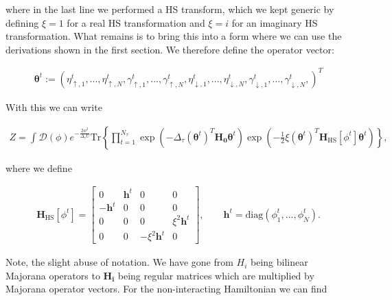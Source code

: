 \documentclass{article}
\begin{document}
where in the last line we performed a HS transform, which we kept generic by defining $\xi = 1$ for a real HS transformation and $\xi = i$ for an imaginary HS transformation. What remains is to bring this into a form where we can use the derivations shown in the first section. We therefore define the operator vector:

\begin{align}
	\boldsymbol{\theta}^{t} := \left(\eta_{\uparrow,1}^{t}, ...,\eta_{\uparrow,N}^{t}, \gamma_{\uparrow,1}^{t} ,...,\gamma_{\uparrow,N}^{t} ,\eta_{\downarrow,1}^{t}, ...,\eta_{\downarrow,N}^{t}, \gamma_{\downarrow,1}^{t} ,...,\gamma_{\downarrow,N}^{t} , \right)^T 
\end{align}

With this we can write

\begin{align}
	Z = \int_{ }^{ } \mathcal{D}\left(\phi\right)e^{-\frac{2\phi^{2} }{\Delta_\tau U}} \mathrm{Tr} \left\{\prod_{t=1}^{N_\tau}\exp \left( -\Delta_\tau \left( \boldsymbol{\theta}^{t} \right)^T \boldsymbol{H_0} \boldsymbol{\theta}^{t}   \right) \exp \left(  -\frac{1}{2}\xi   \left(\boldsymbol{\theta}^{t} \right)^T \boldsymbol{H}_{\mathrm{HS}  }\left[ \phi^{t}  \right]  \boldsymbol{\theta}^{t} \right)  \right\},
\end{align}

where we define

\begin{align}
	\boldsymbol{H}_{\mathrm{HS}  }\left[ \phi^{t}  \right] = \begin{bmatrix}
		0 & \boldsymbol{h}^{t} & 0  & 0 \\
		-\boldsymbol{h}^{t}& 0 & 0  & 0 \\
		0 & 0 & 0 & \xi ^{2}\boldsymbol{h}^{t}\\
		0 & 0 & -\xi^2 \boldsymbol{h}^{t} & 0
	\end{bmatrix}, \quad\quad \boldsymbol{h}^{t} = \mathrm{diag} \left(\phi^{t}_1,...,\phi^{t}_N\right) .
\end{align}

Note, the slight abuse of notation. We have gone from $H_i$ being bilinear Majorana operators to $\boldsymbol{H_i}$ being regular matrices which are multiplied by Majorana operator vectors. For the non-interacting Hamiltonian we can find
\end{document}
